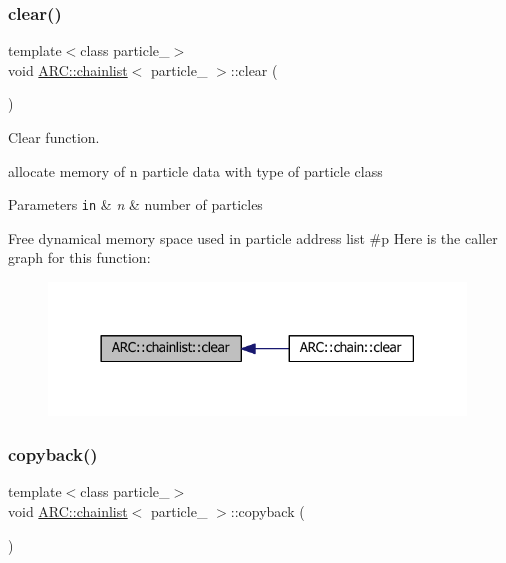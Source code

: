\subsubsection{\texorpdfstring{clear()}{clear()}}
{\footnotesize\ttfamily template$<$class particle\+\_\+$>$ \\
void \hyperlink{classARC_1_1chainlist}{A\+R\+C\+::chainlist}$<$ particle\+\_\+ $>$\+::clear (\begin{DoxyParamCaption}{ }\end{DoxyParamCaption})\hspace{0.3cm}{\ttfamily [inline]}}



Clear function. 

allocate memory of n particle data with type of particle class 
\begin{DoxyParams}[1]{Parameters}
\mbox{\tt in}  & {\em n} & number of particles\\
\hline
\end{DoxyParams}
Free dynamical memory space used in particle address list \#p Here is the caller graph for this function\+:
\nopagebreak
\begin{figure}[H]
\begin{center}
\leavevmode
\includegraphics[width=314pt]{classARC_1_1chainlist_af6b33790ba054657d9e132c177ed7f04_icgraph}
\end{center}
\end{figure}
\hypertarget{classARC_1_1chainlist_aba70559e1b70882256a7805744e22b25}{}\label{classARC_1_1chainlist_aba70559e1b70882256a7805744e22b25} 
\subsubsection{\texorpdfstring{copyback()}{copyback()}}
{\footnotesize\ttfamily template$<$class particle\+\_\+$>$ \\
void \hyperlink{classARC_1_1chainlist}{A\+R\+C\+::chainlist}$<$ particle\+\_\+ $>$\+::copyback (\begin{DoxyParamCaption}{ }\end{DoxyParamCaption})\hspace{0.3cm}{\ttfamily [inline]}}



